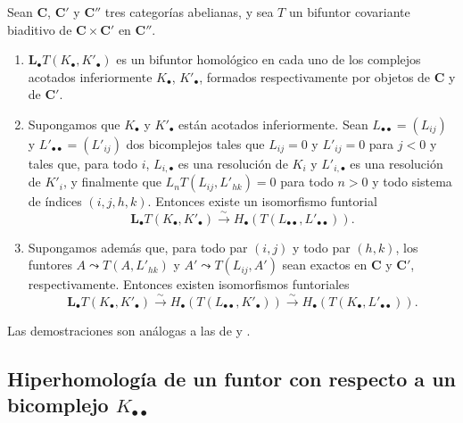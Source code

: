 \begin{proposition}[11.6.5]
\label{0.11.6.5}
\label{0.11.6.5-fr}
Sean $\boldsymbol{C}$, $\boldsymbol{C}'$ y $\boldsymbol{C}''$ tres categorías abelianas, y sea $T$ un bifuntor covariante biaditivo de $\boldsymbol{C}\times\boldsymbol{C}'$ en $\boldsymbol{C}''$.
\begin{enumerate}
  \item[{\rm(i)}] {$\mathbf{L}_\bullet T(K_\bullet,K'_\bullet)$ es un bifuntor homológico en cada uno de los complejos acotados inferiormente $K_\bullet$, $K'_\bullet$, formados respectivamente por objetos de $\boldsymbol{C}$ y de $\boldsymbol{C}'$.}

  \item[{\rm(ii)}] {Supongamos que $K_\bullet$ y $K'_\bullet$ están acotados inferiormente.
  Sean $L_{\bullet\bullet}=(L_{ij})$ y $L'_{\bullet\bullet}=(L'_{ij})$ dos bicomplejos tales que $L_{ij}=0$ y $L'_{ij}=0$ para $j<0$ y tales que, para todo $i$, $L_{i,\bullet}$ es una resolución de $K_i$ y $L'_{i,\bullet}$ es una resolución de $K'_i$, y finalmente que $L_nT(L_{ij},L'_{hk})=0$ para todo $n>0$ y todo sistema de índices $(i,j,h,k)$.
  Entonces existe un isomorfismo funtorial}
  \[
\label{0.11.6.5.1-fr}
\tag{11.6.5.1}
\mathbf{L}_\bullet T(K_\bullet,K'_\bullet)
\xrightarrow{\sim} H_\bullet(T(L_{\bullet\bullet},L'_{\bullet\bullet})).
\]

  \item[{\rm(iii)}] {Supongamos además que, para todo par $(i,j)$ y todo par $(h,k)$, los funtores $A\leadsto T(A,L'_{hk})$ y $A'\leadsto T(L_{ij},A')$ sean exactos en $\boldsymbol{C}$ y $\boldsymbol{C}'$, respectivamente.
  Entonces existen isomorfismos funtoriales}
  \[
\label{0.11.6.5.2-fr}
\tag{11.6.5.2}
\mathbf{L}_\bullet T(K_\bullet,K'_\bullet)
\xrightarrow{\sim} H_\bullet(T(L_{\bullet\bullet},K'_\bullet))
\xrightarrow{\sim} H_\bullet(T(K_\bullet,L'_{\bullet\bullet})).
\]
\end{enumerate}

\upshape Las demostraciones son análogas a las de  y .
\end{proposition}

\subsection{Hiperhomología de un funtor con respecto a un bicomplejo $K_{\bullet\bullet}$}
\label{subsection:0.11.7}
\label{subsection:0.11.7-fr}

